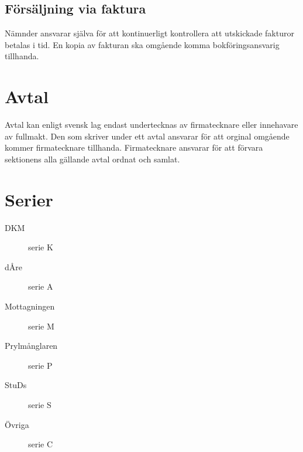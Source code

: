 \documentclass{dgovdoc}
\begin{document}
\subsection{Försäljning via faktura}
Nämnder ansvarar själva för att kontinuerligt kontrollera att utskickade fakturor betalas i tid. En kopia av
fakturan ska omgående komma bokföringsansvarig tillhanda.

\section{Avtal}

Avtal kan enligt svensk lag endast undertecknas av firmatecknare eller innehavare av fullmakt. Den som
skriver under ett avtal ansvarar för att orginal omgående kommer firmatecknare tillhanda. Firmatecknare
ansvarar för att förvara sektionens alla gällande avtal ordnat och samlat.

\appendix

\section{Serier}
\label{sec:serier}

\begin{description}
\item[DKM] serie K
\item[dÅre] serie A
\item[Mottagningen] serie M
\item[Prylmånglaren] serie P
\item[StuDs] serie S
\item[Övriga] serie C
\end{description}
\end{document}
